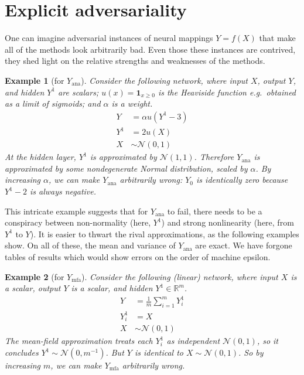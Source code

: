 \documentclass{article}
\newtheorem{example}{Example}
\begin{document}
\section{Explicit adversariality}
One can imagine adversarial instances of neural mappings \(Y=f(X)\) that make all of the methods look arbitrarily bad.
Even those these instances are contrived, they shed light on the relative strengths and weaknesses of the methods.

\begin{example}[for \(Y_\mathrm{ana}\)]
  Consider the following network, where input \(X\), output \(Y\), and hidden \(Y^1\) are scalars; \(u(x) = \bm{1}_{x \geq 0}\) is the Heaviside function e.g.~obtained as a limit of sigmoids; and \(\alpha\) is a weight.
  \begin{align*}
    Y &= \alpha u(Y^1 - 3)
    \\
    Y^1 &= 2 u(X)
    \\
    X &\sim \mathcal N(0, 1)
  \end{align*}
  At the hidden layer, \(Y^1 \) is approximated by \(\mathcal N(1, 1)\).
  Therefore \(Y_\mathrm{ana}\) is approximated by some nondegenerate Normal distribution, scaled by \(\alpha\).
  By increasing \(\alpha\), we can make \(Y_\mathrm{ana}\) arbitrarily wrong:
  \(Y_0\) is identically zero because \(Y^1 -2 \) is always negative.

  
\end{example}

This intricate example suggests that for \(Y_\mathrm{ana}\) to fail, there needs to be a conspiracy between non-normality (here, \(Y^1\)) and strong nonlinearity (here, from \(Y^1\) to \(Y\)).
It is easier to thwart the rival approximations, as the following examples show.
On all of these, the mean and variance of \(Y_\mathrm{ana}\) are exact.
We have forgone tables of results which would show errors on the order of machine epsilon.

\begin{example}[for \(Y_\mathrm{mfa}\)]
  Consider the   following (linear) network, where input \(X\) is a scalar, output \(Y\) is a scalar, and hidden \(Y^1\in \mathbb{R}^m\).
  \begin{align*}
    Y &= \frac{1}{m} \sum_{i=1}^m Y^1_i
    \\
    Y^1_i &= X
    \\
    X &\sim \mathcal N(0, 1)
  \end{align*}
  The mean-field approximation treats each \(Y_i^1\) as independent \(\mathcal N(0, 1)\), so it concludes \(Y^1\sim \mathcal N(0, m^{-1})\).
  But \(Y\) is identical to \(X\sim \mathcal N(0, 1)\).
  So by increasing \(m\), we can make \(Y_\mathrm{mfa}\) arbitrarily wrong.
\end{example}
\end{document}
